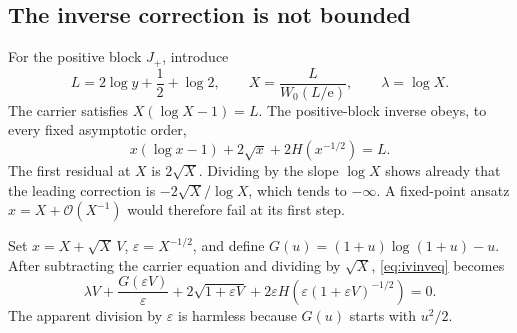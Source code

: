 \documentclass[11pt,a4paper]{article}
\theoremstyle{definition}
\theoremstyle{remark}
\newcommand{\ee}{\mathrm e}
\newcommand{\OO}{\mathcal O}
\numberwithin{equation}{section}
\begin{document}
\subsection{The inverse correction is not bounded}
For the positive block $J_+$, introduce
\begin{equation}
 L=2\log y+\frac12+\log2,\qquad
 X=\frac{L}{W_0(L/\ee)},\qquad \lambda=\log X.
 \label{eq:ivcore}
\end{equation}
The carrier satisfies $X(\log X-1)=L$. The positive-block inverse obeys, to every fixed asymptotic order,
\begin{equation}
 x(\log x-1)+2\sqrt x+2H(x^{-1/2})=L.
 \label{eq:ivinveq}
\end{equation}
The first residual at $X$ is $2\sqrt X$. Dividing by the slope $\log X$ shows already that the leading correction is $-2\sqrt X/\log X$, which tends to $-\infty$. A fixed-point ansatz $x=X+\OO(X^{-1})$ would therefore fail at its first step.

Set $x=X+\sqrt X\,V$, $\varepsilon=X^{-1/2}$, and define
$G(u)=(1+u)\log(1+u)-u$. After subtracting the carrier equation and dividing by $\sqrt X$, \eqref{eq:ivinveq} becomes
\begin{equation}
 \lambda V+\frac{G(\varepsilon V)}{\varepsilon}
 +2\sqrt{1+\varepsilon V}
 +2\varepsilon H\!\left(\varepsilon(1+\varepsilon V)^{-1/2}\right)=0.
 \label{eq:ivVeq}
\end{equation}
The apparent division by $\varepsilon$ is harmless because $G(u)$ starts with $u^2/2$.
\end{document}
